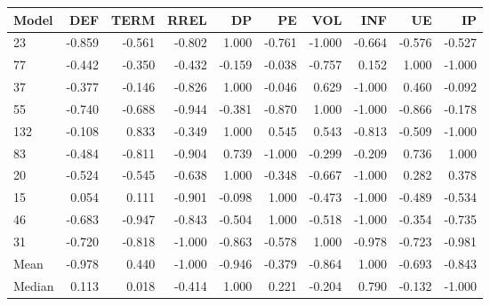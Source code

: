 \begin{table}
\centering
\label{tab:SSD_loss_standardised_10}
\begin{tabular}{lrrrrrrrrr}
\toprule
 Model &    DEF &   TERM &   RREL &     DP &     PE &    VOL &    INF &     UE &     IP \\
\midrule
    23 & -0.859 & -0.561 & -0.802 &  1.000 & -0.761 & -1.000 & -0.664 & -0.576 & -0.527 \\
    77 & -0.442 & -0.350 & -0.432 & -0.159 & -0.038 & -0.757 &  0.152 &  1.000 & -1.000 \\
    37 & -0.377 & -0.146 & -0.826 &  1.000 & -0.046 &  0.629 & -1.000 &  0.460 & -0.092 \\
    55 & -0.740 & -0.688 & -0.944 & -0.381 & -0.870 &  1.000 & -1.000 & -0.866 & -0.178 \\
   132 & -0.108 &  0.833 & -0.349 &  1.000 &  0.545 &  0.543 & -0.813 & -0.509 & -1.000 \\
    83 & -0.484 & -0.811 & -0.904 &  0.739 & -1.000 & -0.299 & -0.209 &  0.736 &  1.000 \\
    20 & -0.524 & -0.545 & -0.638 &  1.000 & -0.348 & -0.667 & -1.000 &  0.282 &  0.378 \\
    15 &  0.054 &  0.111 & -0.901 & -0.098 &  1.000 & -0.473 & -1.000 & -0.489 & -0.534 \\
    46 & -0.683 & -0.947 & -0.843 & -0.504 &  1.000 & -0.518 & -1.000 & -0.354 & -0.735 \\
    31 & -0.720 & -0.818 & -1.000 & -0.863 & -0.578 &  1.000 & -0.978 & -0.723 & -0.981 \\
  Mean & -0.978 &  0.440 & -1.000 & -0.946 & -0.379 & -0.864 &  1.000 & -0.693 & -0.843 \\
Median &  0.113 &  0.018 & -0.414 &  1.000 &  0.221 & -0.204 &  0.790 & -0.132 & -1.000 \\
\bottomrule
\end{tabular}
\end{table}
